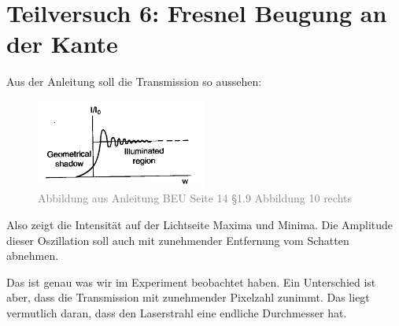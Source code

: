 \section{Teilversuch 6: Fresnel Beugung an der Kante}
	Aus der Anleitung soll die Transmission so aussehen:
	\begin{figure}[H]
		\centering
		\includegraphics[width=0.5\textwidth]{images/kante.jpg}
		\caption{\textcolor{gray}{Abbildung aus Anleitung BEU Seite 14 §1.9 Abbildung 10 rechts}}
		\label{fig:kante-trans}
	\end{figure}
	Also zeigt die Intensität auf der Lichtseite Maxima und Minima. Die Amplitude dieser Oszillation soll auch mit zunehmender Entfernung vom Schatten abnehmen. 

	Das ist genau was wir im Experiment beobachtet haben. Ein Unterschied ist aber, dass die Transmission mit zunehmender Pixelzahl zunimmt. Das liegt vermutlich daran, dass den Laserstrahl eine endliche Durchmesser hat. 